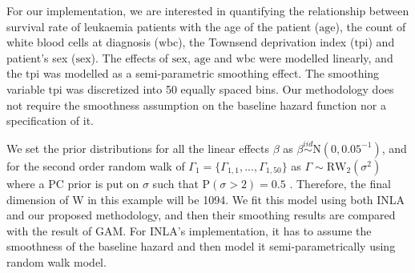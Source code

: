 \documentclass[]{article}
\begin{document}
For our implementation, we are interested in quantifying the relationship between survival rate of leukaemia patients with the age of the patient ($\text{age}$), the count of white blood cells at diagnosis ($\text{wbc}$), the Townsend deprivation index ($\text{tpi}$) and patient's sex ($\text{sex}$). The effects of $\text{sex}$, $\text{age}$ and $\text{wbc}$ were modelled linearly, and the $\text{tpi}$ was modelled as a semi-parametric smoothing effect. The smoothing variable $\text{tpi}$ was discretized into 50 equally spaced bins. Our methodology does not require the smoothness assumption on the baseline hazard function nor a specification of it.

We set the prior distributions for all the linear effects $\beta$ as $\beta \stackrel{iid}{\sim} \text{N}(0, 0.05^{-1})$, and for the second order random walk of $\Gamma_1 = \{\Gamma_{1,1}, ..., \Gamma_{1,50}\}$ as $\Gamma \sim \text{RW}_2(\sigma^2)$ where a PC prior is put on $\sigma$ such that $\text{P}(\sigma > 2) = 0.5$ \citep{pcprior}. Therefore, the final dimension of W in this example will be 1094. We fit this model using both INLA and our proposed methodology, and then their smoothing results are compared with the result of GAM. For INLA's implementation, it has to assume the smoothness of the baseline hazard and then model it semi-parametrically using random walk model. 
\end{document}
